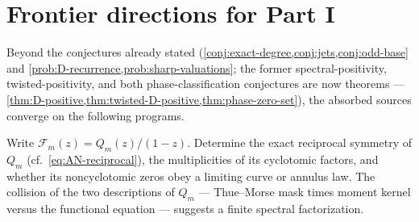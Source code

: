 \documentclass[11pt,oneside]{article}
\numberwithin{equation}{section}
\theoremstyle{definition}
\theoremstyle{remark}
\newcommand{\Frow}{\mathscr F}
\begin{document}
\section{Frontier directions for Part I}
\label{sec:frontiers-sums}

Beyond the conjectures already stated
(\cref{conj:exact-degree,conj:jets,conj:odd-base}
and \cref{prob:D-recurrence,prob:sharp-valuations}; the former
spectral-positivity, twisted-positivity, and both phase-classification
conjectures are now theorems ---
\cref{thm:D-positive,thm:twisted-D-positive,thm:phase-zero-set}), the
absorbed sources converge on the following programs.

\begin{problem}
\label{prob:row-geometry}
Write $\Frow_m(z)=Q_m(z)/(1-z)$.  Determine the exact reciprocal
symmetry of $Q_m$ (cf.\ \eqref{eq:AN-reciprocal}), the multiplicities
of its cyclotomic factors, and whether its noncyclotomic zeros obey a
limiting curve or annulus law.  The collision of the two descriptions
of $Q_m$ --- Thue--Morse mask times moment kernel versus the
functional equation --- suggests a finite spectral factorization.
\end{problem}
\end{document}
